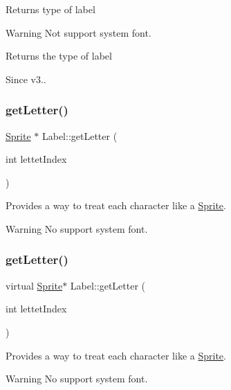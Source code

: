 Returns type of label

\begin{DoxyWarning}{Warning}
Not support system font. 
\end{DoxyWarning}
\begin{DoxyReturn}{Returns}
the type of label 
\end{DoxyReturn}
\begin{DoxySince}{Since}
v3.. 
\end{DoxySince}
\mbox{\label{classLabel_aa9bdfe420734060b6431848aa23c5b89}} 
\subsubsection{\texorpdfstring{get\+Letter()}{getLetter()}\hspace{0.1cm}{\footnotesize\ttfamily [1/2]}}
{\footnotesize\ttfamily \hyperlink{classSprite}{Sprite} $\ast$ Label\+::get\+Letter (\begin{DoxyParamCaption}\item[{int}]{lettet\+Index }\end{DoxyParamCaption})\hspace{0.3cm}{\ttfamily [virtual]}}

Provides a way to treat each character like a \hyperlink{classSprite}{Sprite}. \begin{DoxyWarning}{Warning}
No support system font. 
\end{DoxyWarning}
\mbox{\label{classLabel_a32b5de8c5fac5c9084eb713ff4ce9f3b}} 
\subsubsection{\texorpdfstring{get\+Letter()}{getLetter()}\hspace{0.1cm}{\footnotesize\ttfamily [2/2]}}
{\footnotesize\ttfamily virtual \hyperlink{classSprite}{Sprite}$\ast$ Label\+::get\+Letter (\begin{DoxyParamCaption}\item[{int}]{lettet\+Index }\end{DoxyParamCaption})\hspace{0.3cm}{\ttfamily [virtual]}}

Provides a way to treat each character like a \hyperlink{classSprite}{Sprite}. \begin{DoxyWarning}{Warning}
No support system font. 
\end{DoxyWarning}
\mbox{\label{classLabel_afec75d9e7948756cee3ed98c4a94b6b4}} 
